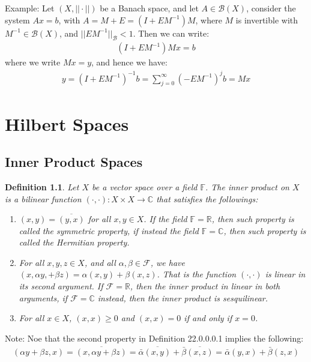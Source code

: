 \documentclass[11pt]{book}
\theoremstyle{break}
\theoremstyle{break}
\newtheorem{defn}{Definition}[corL]
\newcommand{\R}{\mathbb{R}}
\newcommand{\C}{\mathbb{C}}
\newcommand{\F}{\mathcal{F}}
\newcommand{\note}{\color{red}Note: \color{black}}
\newcommand{\example}{\color{green}Example: \color{black}}
\begin{document}
\example 
Let $(X,||\cdot ||)$ be a Banach space, and let $A \in \mathcal{B}(X)$, consider the system $Ax = b$, with $A = M+E = (I+E M^{-1}) M$, where $M$ is invertible with $M^{-1} \in \mathcal{B}(X)$, and $||EM^{-1}||_{\mathcal{B}}<1$. Then we can write:
\begin{align*}
(I + EM^{-1})Mx = b
\end{align*}
where we write $Mx = y$, and hence we have:
\begin{align*}
y = (I + EM^{-1})^{-1} b = \sum_{j=0}^\infty (-EM^{-1})^j b = Mx
\end{align*}




\newpage
\chapter{Hilbert Spaces}
\setcounter{section}{21}
\section[Inner Product Spaces]{\color{red}Inner Product Spaces\color{black}}
\begin{defn}
Let $X$ be a vector space over a field $\mathbb{F}$. The inner product on $X$ is a bilinear function $
(\cdot, \cdot ): X \times X \to \C$
that satisfies the followings:
\begin{enumerate}[topsep=3pt,itemsep=-1ex,partopsep=1ex,parsep=1ex]
\item $(x,y) = \overline{(y,x)}$ for all $x,y \in X$. If the field $\mathbb{F} = \R$, then such property is called the symmetric property, if instead the field $\mathbb{F} = \C$, then such property is called the Hermitian property.
\item For all $x,y,z \in X$, and all $\alpha, \beta \in \F$, we have $(x,\alpha y, +\beta z) = \alpha(x,y) + \beta(x,z)$. That is the function $(\cdot, \cdot)$ is linear in its second argument. If $\F = \R$, then the inner product in linear in both arguments, if $\F= \C$ instead, then the inner product is sesquilinear.
\item For all $x \in X$, $(x,x) \geq 0$ and $(x,x) = 0$ if and only if $x = 0$. 
\end{enumerate}
\end{defn}
\note Noe that the second property in Definition 22.0.0.0.1 implies the following:\begin{align*}
(\alpha y + \beta z, x) = \overline{(x,\alpha y + \beta z)} = \bar{\alpha}\overline{(x,y)} + \bar{\beta}\overline{(x,z)} = \bar{\alpha}(y,x) + \bar{\beta}(z,x)
\end{align*}
\end{document}
